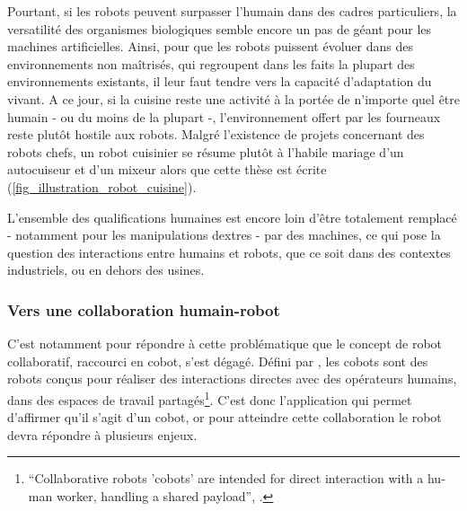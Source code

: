 Pourtant, si les robots peuvent surpasser l'humain dans des cadres particuliers, la versatilité des organismes biologiques semble encore un pas de géant pour les machines artificielles. Ainsi, pour que les robots puissent évoluer dans des environnements non maîtrisés, qui regroupent dans les faits la plupart des environnements existants, il leur faut tendre vers la capacité d'adaptation du vivant. A ce jour, si la cuisine reste une activité à la portée de n'importe quel être humain - ou du moins de la plupart -, l'environnement offert par les fourneaux reste plutôt hostile aux robots. Malgré l'existence de projets concernant des robots chefs, un robot cuisinier se résume plutôt à l'habile mariage d'un autocuiseur et d'un mixeur alors que cette thèse est écrite (\cref{fig_illustration_robot_cuisine}).




L'ensemble des qualifications humaines est encore loin d'être totalement remplacé - notamment pour les manipulations dextres - par des machines, ce qui pose la question des interactions entre humains et robots, que ce soit dans des contextes industriels, ou en dehors des usines.

\subsubsection{Vers une collaboration humain-robot}

C'est notamment pour répondre à cette problématique que le concept de robot collaboratif, raccourci en cobot, s'est dégagé. Défini par \parencite{peshkin_cobots_1999}, les cobots sont des robots conçus pour réaliser des interactions directes avec des opérateurs humains, dans des espaces de travail partagés\footnote{\label{footnote_cobot}\foreignquote{french}{Collaborative robots 'cobots' are intended for direct interaction with a human worker, handling a shared payload}, \parencite{peshkin_cobots_1999}.}. C'est donc l'application qui permet d'affirmer qu'il s'agit d'un cobot, or pour atteindre cette collaboration le robot devra répondre à plusieurs enjeux.

